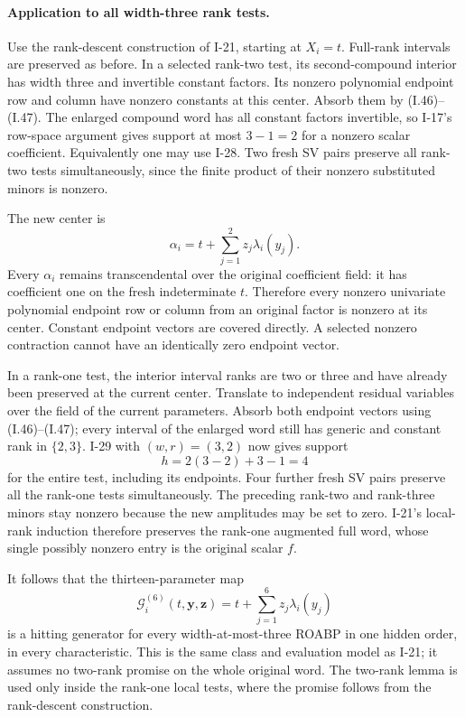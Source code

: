 \paragraph{Application to all width-three rank tests.}
Use the rank-descent construction of I-21, starting at
$X_i=t$.  Full-rank intervals are preserved as before.
In a selected rank-two test, its second-compound interior
has width three and invertible constant factors.  Its
nonzero polynomial endpoint row and column have nonzero
constants at this center.  Absorb them by (I.46)--(I.47).
The enlarged compound word has all constant factors
invertible, so I-17's row-space argument gives support at
most $3-1=2$ for a nonzero scalar coefficient.  Equivalently
one may use I-28.  Two fresh SV pairs preserve all rank-two
tests simultaneously, since the finite product of their
nonzero substituted minors is nonzero.

The new center is
\[
 \alpha_i=t+\sum_{j=1}^2z_j\lambda_i(y_j).
\]
Every $\alpha_i$ remains transcendental over the original
coefficient field: it has coefficient one on the fresh
indeterminate $t$.  Therefore every nonzero univariate
polynomial endpoint row or column from an original factor
is nonzero at its center.  Constant endpoint vectors are
covered directly.  A selected nonzero contraction cannot
have an identically zero endpoint vector.

In a rank-one test, the interior interval ranks are two or
three and have already been preserved at the current center.
Translate to independent residual variables over the field
of the current parameters.  Absorb both endpoint vectors
using (I.46)--(I.47); every interval of the enlarged word
still has generic and constant rank in $\{2,3\}$.
I-29 with $(w,r)=(3,2)$ now gives support
\[
 h=2(3-2)+3-1=4
\]
for the entire test, including its endpoints.  Four further
fresh SV pairs preserve all the rank-one tests simultaneously.
The preceding rank-two and rank-three minors stay nonzero
because the new amplitudes may be set to zero.
I-21's local-rank induction therefore preserves the rank-one
augmented full word, whose single possibly nonzero entry is
the original scalar $f$.

It follows that the thirteen-parameter map
\[
 \mathcal G_i^{(6)}(t,\mathbf y,\mathbf z)
      =t+\sum_{j=1}^{6}z_j\lambda_i(y_j)
 \tag{I.48}
\]
is a hitting generator for every width-at-most-three ROABP
in one hidden order, in every characteristic.  This is the
same class and evaluation model as I-21; it assumes no
two-rank promise on the whole original word.  The two-rank
lemma is used only inside the rank-one local tests, where
the promise follows from the rank-descent construction.

